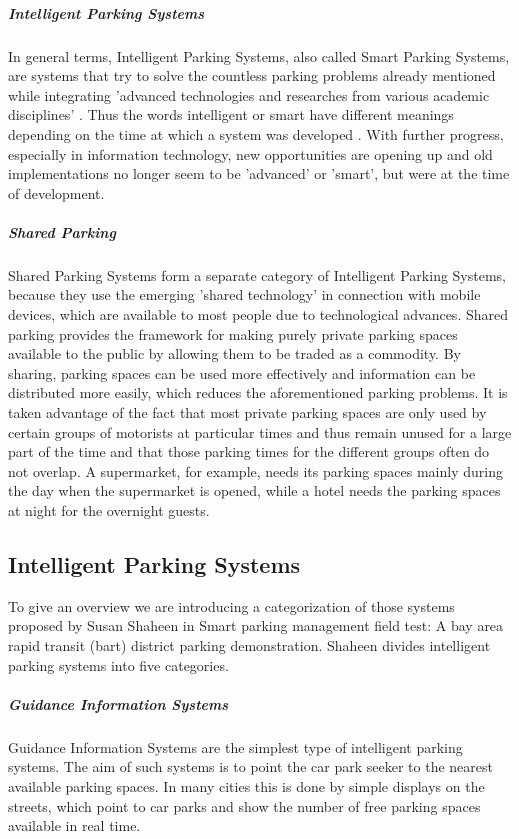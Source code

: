 \documentclass[
a4paper,     %
titlepage,   %
14pt         %
]{scrartcl}  %
\theoremstyle{mystyle}
\begin{document}
\subparagraph{Intelligent Parking Systems}
In general terms, Intelligent Parking Systems, also called Smart Parking Systems, are systems that try to solve the countless parking problems already mentioned while integrating 'advanced technologies and researches from various academic disciplines' \cite{idris2009car}. Thus the words intelligent or smart have different meanings depending on the time at which a system was developed \cite{fraifer2016investigation}. With further progress, especially in information technology, new opportunities are opening up and old implementations no longer seem to be 'advanced' or 'smart', but were at the time of development.

\subparagraph{Shared Parking}
Shared Parking Systems form a separate category of Intelligent Parking Systems, because they use the emerging 'shared technology' in connection with mobile devices, which are available to most people due to technological advances. Shared parking provides the framework for making purely private parking spaces available to the public by allowing them to be traded as a commodity. \cite{itdp2014shared} By sharing, parking spaces can be used more effectively and information can be distributed more easily, which reduces the aforementioned parking problems. It is taken advantage of the fact that most private parking spaces are only used by certain groups of motorists at particular times and thus remain unused for a large part of the time and that those parking times for the different groups often do not overlap.\cite{vtpi2015shared} A supermarket, for example, needs its parking spaces mainly during the day when the supermarket is opened, while a hotel needs the parking spaces at night for the overnight guests.\\

\subsection{Intelligent Parking Systems}

To give an overview we are introducing a categorization of those systems proposed by Susan Shaheen in Smart parking management field test: A bay area rapid transit (bart) district parking demonstration.\cite{shaheen2005smart} Shaheen divides intelligent parking systems into five categories.

\subparagraph{Guidance Information Systems}
Guidance Information Systems are the simplest type of intelligent parking systems. The aim of such systems is to point the car park seeker to the nearest available parking spaces. In many cities this is done by simple displays on the streets, which point to car parks and show the number of free parking spaces available in real time.
\end{document}
